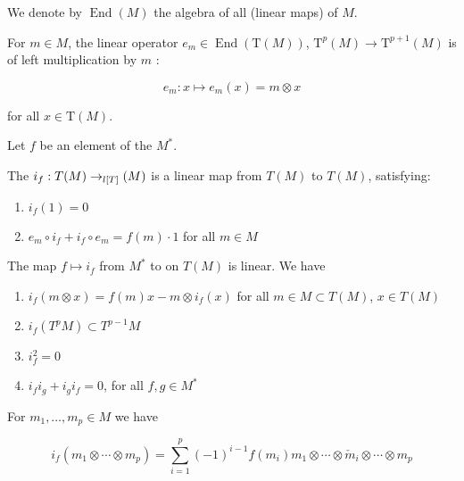 \begin{definition}
    \label{antiDeriv}

    We denote by $\operatorname{End}(M)$ the algebra of all  (linear maps) of $M$.
    
    For $m \in M$, the linear operator
    $e_{m} \in \operatorname{End}(\mathrm{T}(M))$, $\mathrm{T}^{p}(M) \rightarrow \mathrm{T}^{p+1}(M)$ is of left multiplication by $m$ :

    $$
    e_{m}: x \mapsto e_{m}(x) = m \otimes x
    $$

    for all $x \in \mathrm{T}(M)$.

    Let $f$ be an element of the  $M^{*}$.

    The  $i_{f} : T(M) \to_{l[T]}(M)$ is a linear map from $T(M)$ to $T(M)$, satisfying:

    \begin{enumerate}

    \item $i_{f}(1) = 0$
    
    \item $e_{m} \circ i_{f} + i_{f} \circ e_{m} = f(m) \cdot 1$ for all $m \in M$
    
    \end{enumerate}

    The map $f \mapsto i_{f}$ from $M^{*}$ to  on $T(M)$ is linear. We have

    \begin{enumerate}

    \item $i_{f}(m \otimes x) = f(m) x - m \otimes i_{f}(x)$ for all $m \in M \subset T(M)$, $x \in T(M)$
    
    \item $i_{f}\left( T^{p} M \right) \subset T^{p-1} M$
    
    \item $i_{f}^{2} = 0$
    
    \item $i_{f} i_{g} + i_{g} i_{f} = 0$, for all $f, g \in M^{*}$
    
    \end{enumerate}

    For $m_{1}, \ldots, m_{p} \in M$ we have

    $$
    i_{f}\left(m_{1} \otimes \cdots \otimes m_{p}\right)=\sum_{i=1}^{p}(-1)^{i-1} f\left(m_{i}\right) m_{1} \otimes \cdots \otimes \check{m}_{i} \otimes \cdots \otimes m_{p}
    $$


\end{definition}
